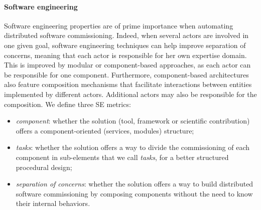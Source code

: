 \paragraph{Software engineering}
Software engineering properties are of prime importance when
automating distributed software commissioning. Indeed, when several
actors are involved in one given goal, software engineering techniques
can help improve separation of concerns, meaning that each actor is
responsible for her own expertise domain. This is improved by modular
or component-based approaches, as each actor can be responsible for
one component. Furthermore, component-based architectures also feature
composition mechanisms that facilitate interactions between entities
implemented by different actors. Additional actors may also be
responsible for the composition. We define three SE metrics:
\begin{itemize}
\item \emph{component}: whether the solution (tool, framework or scientific
  contribution) offers a component-oriented (\eg services, modules)
  structure;
\item \emph{tasks}: whether the solution offers a way to divide the
  commissioning of each component in sub-elements that we call
  \emph{tasks}, for a better structured procedural design;
\item \emph{separation of concerns}: whether the solution offers a way to
  build distributed software commissioning by composing components
  without the need to know their internal behaviors.
\end{itemize}


